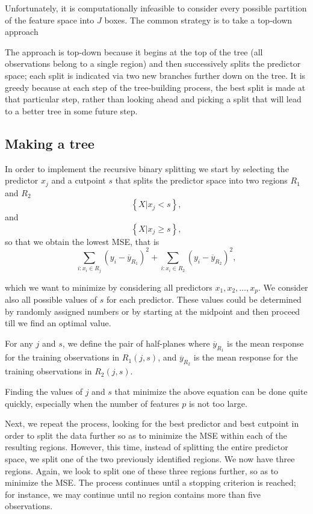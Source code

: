 \documentclass[%
oneside,                 %
final,                   %
10pt]{article}
\begin{document}
Unfortunately, it is computationally infeasible to consider every
possible partition of the feature space into $J$ boxes.  The common
strategy is to take a top-down approach

The approach is top-down because it begins at the top of the tree (all
observations belong to a single region) and then successively splits
the predictor space; each split is indicated via two new branches
further down on the tree. It is greedy because at each step of the
tree-building process, the best split is made at that particular step,
rather than looking ahead and picking a split that will lead to a
better tree in some future step.

\subsection*{Making a tree}

In order to implement the recursive binary splitting we start by selecting
the predictor $x_j$ and a cutpoint $s$ that splits the predictor space into two regions $R_1$ and $R_2$
\[
\left\{X\vert x_j < s\right\},
\]
and
\[
\left\{X\vert x_j \geq s\right\},
\]
so that we obtain the lowest MSE, that is
\[
\sum_{i:x_i\in R_j}(y_i-\overline{y}_{R_1})^2+\sum_{i:x_i\in R_2}(y_i-\overline{y}_{R_2})^2,
\]

which we want to minimize by considering all predictors
$x_1,x_2,\dots,x_p$.  We consider also all possible values of $s$ for
each predictor. These values could be determined by randomly assigned
numbers or by starting at the midpoint and then proceed till we find
an optimal value.

For any $j$ and $s$, we define the pair of half-planes where
$\overline{y}_{R_1}$ is the mean response for the training
observations in $R_1(j,s)$, and $\overline{y}_{R_2}$ is the mean
response for the training observations in $R_2(j,s)$.

Finding the values of $j$ and $s$ that minimize the above equation can be
done quite quickly, especially when the number of features $p$ is not
too large.

Next, we repeat the process, looking
for the best predictor and best cutpoint in order to split the data
further so as to minimize the MSE within each of the resulting
regions. However, this time, instead of splitting the entire predictor
space, we split one of the two previously identified regions. We now
have three regions. Again, we look to split one of these three regions
further, so as to minimize the MSE. The process continues until a
stopping criterion is reached; for instance, we may continue until no
region contains more than five observations.
\end{document}
